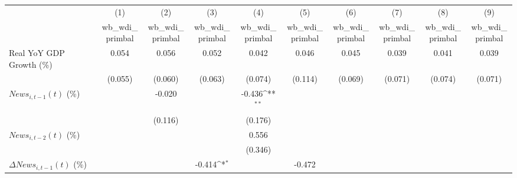 {
\def\sym#1{\ifmmode^{#1}\else\(^{#1}\)\fi}
\begin{tabular}{l*{9}{c}}
\toprule
                    &\multicolumn{1}{c}{(1)}&\multicolumn{1}{c}{(2)}&\multicolumn{1}{c}{(3)}&\multicolumn{1}{c}{(4)}&\multicolumn{1}{c}{(5)}&\multicolumn{1}{c}{(6)}&\multicolumn{1}{c}{(7)}&\multicolumn{1}{c}{(8)}&\multicolumn{1}{c}{(9)}\\
                    &\multicolumn{1}{c}{wb_wdi_primbal}&\multicolumn{1}{c}{wb_wdi_primbal}&\multicolumn{1}{c}{wb_wdi_primbal}&\multicolumn{1}{c}{wb_wdi_primbal}&\multicolumn{1}{c}{wb_wdi_primbal}&\multicolumn{1}{c}{wb_wdi_primbal}&\multicolumn{1}{c}{wb_wdi_primbal}&\multicolumn{1}{c}{wb_wdi_primbal}&\multicolumn{1}{c}{wb_wdi_primbal}\\
\midrule
Real YoY GDP Growth (\%)&       0.054         &       0.056         &       0.052         &       0.042         &       0.046         &       0.045         &       0.039         &       0.041         &       0.039         \\
                    &     (0.055)         &     (0.060)         &     (0.063)         &     (0.074)         &     (0.114)         &     (0.069)         &     (0.071)         &     (0.074)         &     (0.071)         \\
\addlinespace
$ News_{i,t-1}(t)$ (\%)&                     &      -0.020         &                     &      -0.436\sym{**} &                     &                     &                     &                     &                     \\
                    &                     &     (0.116)         &                     &     (0.176)         &                     &                     &                     &                     &                     \\
\addlinespace
$ News_{i,t-2}(t)$ (\%)&                     &                     &                     &       0.556         &                     &                     &                     &                     &                     \\
                    &                     &                     &                     &     (0.346)         &                     &                     &                     &                     &                     \\
\addlinespace
$ \Delta News_{i,t-1}(t)$ (\%)&                     &                     &      -0.414\sym{*}  &                     &      -0.472         &                     &                     &                     &                     \\

\end{tabular}}
